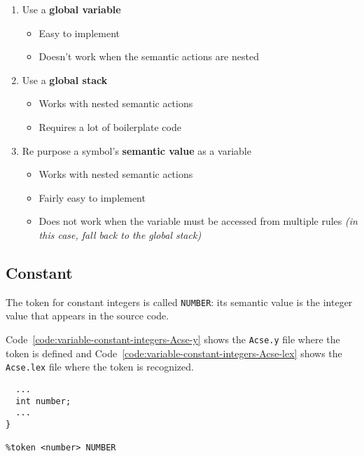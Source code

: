 \begin{enumerate}
  \item Use a \textbf{global variable}
        \begin{itemize}
          \item[\cmarkthin] Easy to implement
          \item[\xmarkthin] Doesn't work when the semantic actions are nested
        \end{itemize}
  \item Use a \textbf{global stack}
        \begin{itemize}
          \item[\cmarkthin] Works with nested semantic actions
          \item[\xmarkthin] Requires a lot of boilerplate code
        \end{itemize}
  \item Re purpose a symbol's \textbf{semantic value} as a variable
        \begin{itemize}
          \item[\cmarkthin] Works with nested semantic actions
          \item[\cmarkthin] Fairly easy to implement
          \item[\xmarkthin] Does not work when the variable must be accessed from multiple rules \textit{(in this case, fall back to the global stack)}
        \end{itemize}
\end{enumerate}

\subsection{Constant}

The token for constant integers is called \texttt{NUMBER}:
its semantic value is the integer value that appears in the \lance source code.

Code~\ref{code:variable-constant-integers-Acse-y} shows the \texttt{Acse.y} file where the token is defined and Code~\ref{code:variable-constant-integers-Acse-lex} shows the \texttt{Acse.lex} file where the token is recognized.

\begin{onepage}
  \begin{lstlisting}[language=LANCE, caption={Content of \texttt{Acse.y} file}, label={code:variable-constant-integers-Acse-y}]
%union {
  ...
  int number;
  ...
}

%token <number> NUMBER
\end{lstlisting}
\end{onepage}

